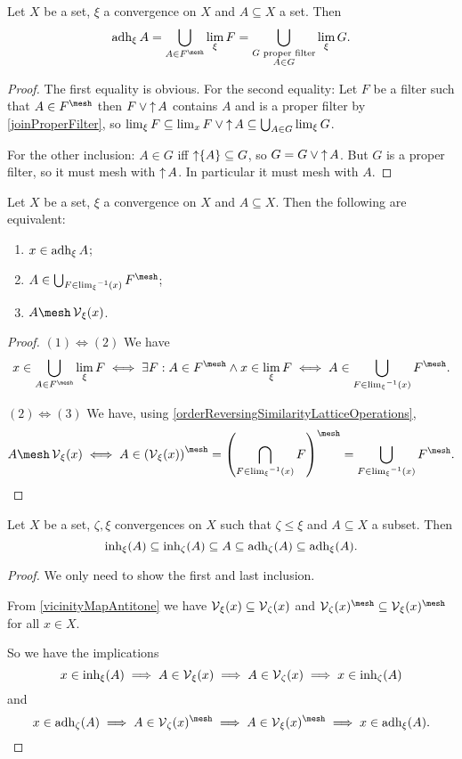 \begin{lemma}
Let $X$ be a set, $\xi$ a convergence on $X$ and $A \subseteq X$ a set. Then
\[ \adh_\xi A = \bigcup_{A \in F^{\mesh}}\lim_\xi F = \bigcup_{\substack{\text{$G$ proper filter} \\ A\in G}}\lim_\xi G. \]
\end{lemma}
\begin{proof}
The first equality is obvious. For the second equality: Let $F$ be a filter such that $A\in F^{\mesh}$ then $F \vee \operatorname{\uparrow} A$ contains $A$ and is a proper filter by \ref{joinProperFilter}, so $\lim_\xi F \subseteq \lim_x F \vee \operatorname{\uparrow} A \subseteq \bigcup_{A\in G}\lim_\xi G$.

For the other inclusion: $A\in G$ iff $\operatorname{\uparrow}\{A\} \subseteq G$, so $G = G \vee \operatorname{\uparrow} A$. But $G$ is a proper filter, so it must mesh with $\operatorname{\uparrow} A$. In particular it must mesh with $A$.
\end{proof}



\begin{proposition}
Let $X$ be a set, $\xi$ a convergence on $X$ and $A \subseteq X$. Then the following are equivalent:
\begin{enumerate}
\item $x\in \operatorname{adh}_\xi A$;
\item $A\in \bigcup_{F\in {\lim_\xi}^{-1}(x)} F^{\mesh}$;
\item $A \mesh \vicinity_\xi(x)$.
\end{enumerate}
\end{proposition}
\begin{proof}
$(1) \Leftrightarrow (2)$ We have
\[ x\in \bigcup_{A\in F^{\mesh}}\lim_\xi F \iff \exists F: A \in F^{\mesh} \land x\in \lim_\xi F \iff A\in  \bigcup_{F\in {\lim_\xi}^{-1}(x)} F^{\mesh}. \]

$(2) \Leftrightarrow (3)$ We have, using \ref{orderReversingSimilarityLatticeOperations},
\[ A \mesh \vicinity_\xi(x) \iff A\in \left(\vicinity_\xi(x)\right)^{\mesh} = \left(\bigcap_{F\in {\lim_\xi}^{-1}(x)}F\right)^{\mesh} = \bigcup_{F\in {\lim_\xi}^{-1}(x)} F^{\mesh}. \]
\end{proof}

\begin{lemma} \label{inherenceAdherenceInclusion}
Let $X$ be a set, $\zeta, \xi$ convergences on $X$ such that $\zeta \leq \xi$ and $A\subseteq X$ a subset. Then
\[ \operatorname{inh}_\xi(A) \subseteq \operatorname{inh}_\zeta(A) \subseteq A \subseteq \operatorname{adh}_\zeta(A) \subseteq \operatorname{adh}_\xi(A). \]
\end{lemma}
\begin{proof}
We only need to show the first and last inclusion.

From \ref{vicinityMapAntitone} we have $\operatorname{\mathcal{V}}_\xi(x) \subseteq \operatorname{\mathcal{V}}_\zeta(x)$ and $\vicinity_\zeta(x)^{\mesh} \subseteq \vicinity_\xi(x)^{\mesh}$ for all $x\in X$.

So we have the implications
\[ x\in \operatorname{inh}_\xi(A) \implies A\in \operatorname{\mathcal{V}}_\xi(x) \implies A\in \operatorname{\mathcal{V}}_\zeta(x) \implies x\in \operatorname{inh}_\zeta(A) \]
and
\[ x\in \adh_\zeta(A) \implies A\in \vicinity_\zeta(x)^{\mesh} \implies A\in \vicinity_\xi(x)^{\mesh} \implies x\in \adh_\xi(A). \]
\end{proof}

